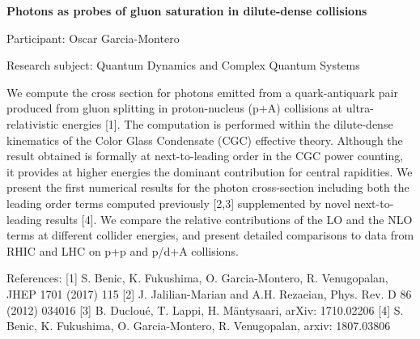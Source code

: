 \begin{minipage}[t]{1.0\textwidth}

\begin{center}

{{\large\bfseries Photons as probes of gluon saturation in dilute-dense collisions}\par}

\end{center}

{\noindent Participant: Oscar Garcia-Montero\par} 

{\noindent Research subject: Quantum Dynamics and Complex Quantum Systems\par}\medskip

\noindent We compute the cross section for photons emitted from a quark-antiquark pair produced from gluon splitting in proton-nucleus (p+A) collisions at ultra-relativistic energies [1]. The computation is performed within the dilute-dense kinematics of the Color Glass Condensate (CGC) effective theory. Although the result obtained is formally at next-to-leading order in the CGC power counting, it provides at higher energies the dominant contribution for central rapidities.
We present the first numerical results for the photon cross-section including both the leading order terms computed previously [2,3] supplemented by novel next-to-leading results [4]. We compare the relative contributions of the LO and the NLO terms at different collider energies, and present detailed comparisons to data from RHIC and LHC on p+p and p/d+A collisions.

References:
[1] S. Benic, K. Fukushima, O. Garcia-Montero, R. Venugopalan, JHEP 1701 (2017) 115 
[2] J. Jalilian-Marian and A.H. Rezaeian, Phys. Rev. D 86 (2012) 034016
[3] B. Ducloué, T. Lappi, H. Mäntysaari, arXiv: 1710.02206 
[4] S. Benic, K. Fukushima, O. Garcia-Montero, R. Venugopalan, arxiv: 1807.03806\par\end{minipage}

\hfill 

